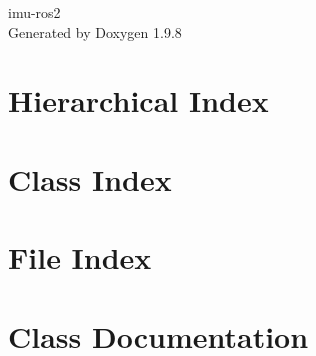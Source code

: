 \documentclass[twoside]{book}
\newcommand{\+}{\discretionary{\mbox{\scriptsize$\hookleftarrow$}}{}{}}
\newcommand{\clearemptydoublepage}{%
    \newpage{\pagestyle{empty}\cleardoublepage}%
  }
\begin{document}
  \raggedbottom
    \hypersetup{pageanchor=false,
                bookmarksnumbered=true,
                pdfencoding=unicode
               }
  \begin{titlepage}
  \vspace*{7cm}
  \begin{center}%
  {\Large imu-\/ros2}\\
  \vspace*{1cm}
  {\large Generated by Doxygen 1.9.8}\\
  \end{center}
  \end{titlepage}
  \clearemptydoublepage
  \tableofcontents
  \clearemptydoublepage
  \hypersetup{pageanchor=true}
\chapter{Hierarchical Index}

\chapter{Class Index}

\chapter{File Index}

\chapter{Class Documentation}




































\end{document}
